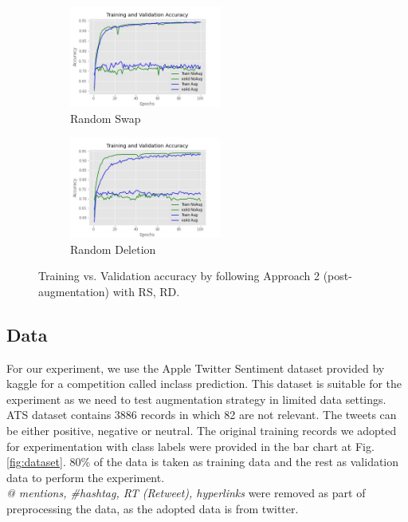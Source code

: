\documentclass{article}
\begin{document}
\begin{figure}
  \begin{subfigure}{6cm}
    \centering\includegraphics[width=5cm]{accuracyrandomswapA2.jpg}
    \caption{Random Swap}
  \end{subfigure}
  \begin{subfigure}{6cm}
    \centering\includegraphics[width=5cm]{accuracyrandomdeleteA2.jpg}
    \caption{Random Deletion}
  \end{subfigure}
  \caption{Training vs. Validation accuracy by following Approach 2 (post-augmentation) with RS, RD.}
  \label{fig:postaugmentA2}
\end{figure}


\subsection{Data}
For our experiment, we use the Apple Twitter Sentiment dataset provided by kaggle for a competition called inclass prediction. This dataset is suitable for the experiment as we need to test augmentation strategy in limited data settings. ATS dataset contains 3886 records in which 82 are not relevant. The tweets can be either positive, negative or neutral. The original training records we adopted for experimentation with class labels were provided in the bar chart at Fig. \ref{fig:dataset}. 80\% of the data is taken as training data and the rest as validation data to perform the experiment. \textit{ \\@ mentions, \#hashtag, RT (Retweet), hyperlinks} were removed as part of preprocessing the data, as the adopted data is from twitter.
\end{document}
